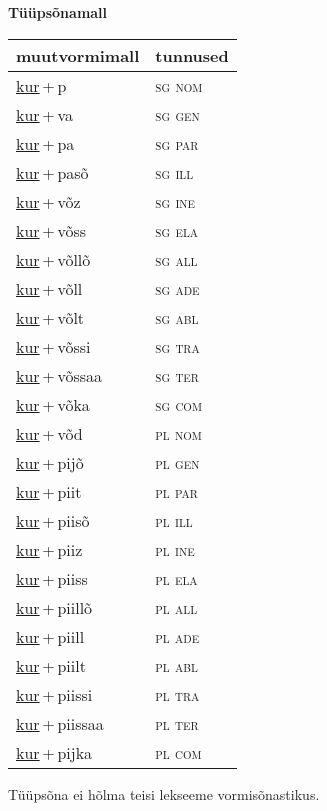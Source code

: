 
\vspace{1.8em}
\begin{minipage}{\textwidth}
\textbf{Tüüpsõnamall \,}\\

\begin{sideways}
\begin{tabular}{l l}
muutvormimall & tunnused \\
\hline
\underline{kur}\,+\,p & \textsc{ sg nom } \\
\underline{kur}\,+\,va & \textsc{ sg gen } \\
\underline{kur}\,+\,pa & \textsc{ sg par } \\
\underline{kur}\,+\,pasõ & \textsc{ sg ill } \\
\underline{kur}\,+\,võz & \textsc{ sg ine } \\
\underline{kur}\,+\,võss & \textsc{ sg ela } \\
\underline{kur}\,+\,võllõ & \textsc{ sg all } \\
\underline{kur}\,+\,võll & \textsc{ sg ade } \\
\underline{kur}\,+\,võlt & \textsc{ sg abl } \\
\underline{kur}\,+\,võssi & \textsc{ sg tra } \\
\underline{kur}\,+\,võssaa & \textsc{ sg ter } \\
\underline{kur}\,+\,võka & \textsc{ sg com } \\
\underline{kur}\,+\,võd & \textsc{ pl nom } \\
\underline{kur}\,+\,pijõ & \textsc{ pl gen } \\
\underline{kur}\,+\,piit & \textsc{ pl par } \\
\underline{kur}\,+\,piisõ & \textsc{ pl ill } \\
\underline{kur}\,+\,piiz & \textsc{ pl ine } \\
\underline{kur}\,+\,piiss & \textsc{ pl ela } \\
\underline{kur}\,+\,piillõ & \textsc{ pl all } \\
\underline{kur}\,+\,piill & \textsc{ pl ade } \\
\underline{kur}\,+\,piilt & \textsc{ pl abl } \\
\underline{kur}\,+\,piissi & \textsc{ pl tra } \\
\underline{kur}\,+\,piissaa & \textsc{ pl ter } \\
\underline{kur}\,+\,pijka & \textsc{ pl com } \\
\end{tabular}
\end{sideways}
\label{tab:tüüpsõnamall-kurp}

\end{minipage}

 
\vspace{1em}
\noindent Tüüpsõna ei hõlma teisi lekseeme vormi\-sõnastikus.
